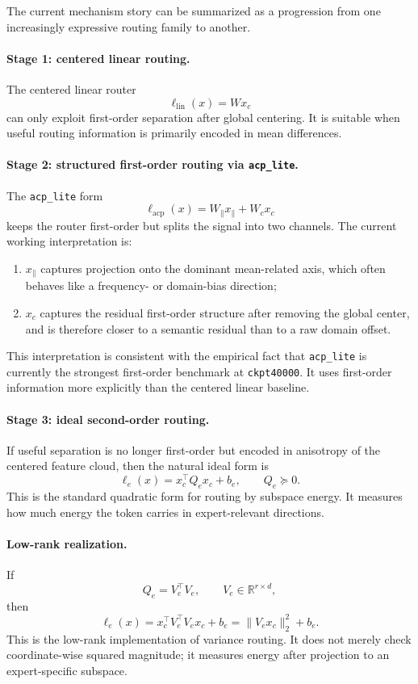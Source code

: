 \documentclass[11pt]{article}
\begin{document}
The current mechanism story can be summarized as a progression from one increasingly expressive routing family to another.

\paragraph{Stage 1: centered linear routing.}
The centered linear router
\[
\ell_{\mathrm{lin}}(x)=W x_c
\]
can only exploit first-order separation after global centering. It is suitable when useful routing information is primarily encoded in mean differences.

\paragraph{Stage 2: structured first-order routing via \texttt{acp\_lite}.}
The \texttt{acp\_lite} form
\[
\ell_{\mathrm{acp}}(x)=W_{\parallel}x_{\parallel}+W_c x_c
\]
keeps the router first-order but splits the signal into two channels. The current working interpretation is:
\begin{enumerate}
    \item $x_{\parallel}$ captures projection onto the dominant mean-related axis, which often behaves like a frequency- or domain-bias direction;
    \item $x_c$ captures the residual first-order structure after removing the global center, and is therefore closer to a semantic residual than to a raw domain offset.
\end{enumerate}

This interpretation is consistent with the empirical fact that \texttt{acp\_lite} is currently the strongest first-order benchmark at \texttt{ckpt40000}. It uses first-order information more explicitly than the centered linear baseline.

\paragraph{Stage 3: ideal second-order routing.}
If useful separation is no longer first-order but encoded in anisotropy of the centered feature cloud, then the natural ideal form is
\[
\ell_e(x)=x_c^\top Q_e x_c+b_e,
\qquad
Q_e \succeq 0.
\]
This is the standard quadratic form for routing by subspace energy. It measures how much energy the token carries in expert-relevant directions.

\paragraph{Low-rank realization.}
If
\[
Q_e = V_e^\top V_e,
\qquad
V_e\in\mathbb{R}^{r\times d},
\]
then
\[
\ell_e(x)=x_c^\top V_e^\top V_e x_c+b_e
=
\|V_e x_c\|_2^2+b_e.
\]
This is the low-rank implementation of variance routing. It does not merely check coordinate-wise squared magnitude; it measures energy after projection to an expert-specific subspace.
\end{document}
